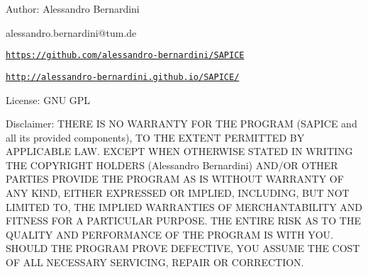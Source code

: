 Author\-: Alessandro Bernardini\begin{DoxyVerb}alessandro.bernardini@tum.de
\end{DoxyVerb}


\href{https://github.com/alessandro-bernardini/SAPICE}{\tt https\-://github.\-com/alessandro-\/bernardini/\-S\-A\-P\-I\-C\-E}

\href{http://alessandro-bernardini.github.io/SAPICE/}{\tt http\-://alessandro-\/bernardini.\-github.\-io/\-S\-A\-P\-I\-C\-E/}

License\-: G\-N\-U G\-P\-L

Disclaimer\-: T\-H\-E\-R\-E I\-S N\-O W\-A\-R\-R\-A\-N\-T\-Y F\-O\-R T\-H\-E P\-R\-O\-G\-R\-A\-M (S\-A\-P\-I\-C\-E and all its provided components), T\-O T\-H\-E E\-X\-T\-E\-N\-T P\-E\-R\-M\-I\-T\-T\-E\-D B\-Y A\-P\-P\-L\-I\-C\-A\-B\-L\-E L\-A\-W. E\-X\-C\-E\-P\-T W\-H\-E\-N O\-T\-H\-E\-R\-W\-I\-S\-E S\-T\-A\-T\-E\-D I\-N W\-R\-I\-T\-I\-N\-G T\-H\-E C\-O\-P\-Y\-R\-I\-G\-H\-T H\-O\-L\-D\-E\-R\-S (Alessandro Bernardini) A\-N\-D/\-O\-R O\-T\-H\-E\-R P\-A\-R\-T\-I\-E\-S P\-R\-O\-V\-I\-D\-E T\-H\-E P\-R\-O\-G\-R\-A\-M A\-S I\-S W\-I\-T\-H\-O\-U\-T W\-A\-R\-R\-A\-N\-T\-Y O\-F A\-N\-Y K\-I\-N\-D, E\-I\-T\-H\-E\-R E\-X\-P\-R\-E\-S\-S\-E\-D O\-R I\-M\-P\-L\-I\-E\-D, I\-N\-C\-L\-U\-D\-I\-N\-G, B\-U\-T N\-O\-T L\-I\-M\-I\-T\-E\-D T\-O, T\-H\-E I\-M\-P\-L\-I\-E\-D W\-A\-R\-R\-A\-N\-T\-I\-E\-S O\-F M\-E\-R\-C\-H\-A\-N\-T\-A\-B\-I\-L\-I\-T\-Y A\-N\-D F\-I\-T\-N\-E\-S\-S F\-O\-R A P\-A\-R\-T\-I\-C\-U\-L\-A\-R P\-U\-R\-P\-O\-S\-E. T\-H\-E E\-N\-T\-I\-R\-E R\-I\-S\-K A\-S T\-O T\-H\-E Q\-U\-A\-L\-I\-T\-Y A\-N\-D P\-E\-R\-F\-O\-R\-M\-A\-N\-C\-E O\-F T\-H\-E P\-R\-O\-G\-R\-A\-M I\-S W\-I\-T\-H Y\-O\-U. S\-H\-O\-U\-L\-D T\-H\-E P\-R\-O\-G\-R\-A\-M P\-R\-O\-V\-E D\-E\-F\-E\-C\-T\-I\-V\-E, Y\-O\-U A\-S\-S\-U\-M\-E T\-H\-E C\-O\-S\-T O\-F A\-L\-L N\-E\-C\-E\-S\-S\-A\-R\-Y S\-E\-R\-V\-I\-C\-I\-N\-G, R\-E\-P\-A\-I\-R O\-R C\-O\-R\-R\-E\-C\-T\-I\-O\-N.


